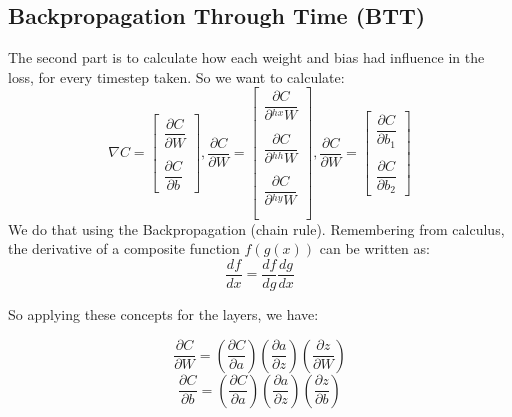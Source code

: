 \documentclass[12pt]{article}
\begin{document}
\subsection{Backpropagation Through Time (BTT)}
The second part is to calculate how each weight and bias had influence in the loss, for every timestep taken. So we want to calculate:
\begin{equation}
\nabla C
=
\begin{bmatrix}
\dfrac{\partial C}{\partial W} \\\\
\dfrac{\partial C}{\partial b} 
\end{bmatrix},
\dfrac{\partial C}{\partial W} = 
\begin{bmatrix}
\dfrac{\partial C}{\partial {}^{hx}W} \\\\
\dfrac{\partial C}{\partial {}^{hh}W} \\\\
\dfrac{\partial C}{\partial {}^{hy}W} \\\\
\end{bmatrix},
\dfrac{\partial C}{\partial W} = 
\begin{bmatrix}
\dfrac{\partial C}{\partial b_{1}} \\\\
\dfrac{\partial C}{\partial b_{2}} 
\end{bmatrix}
\end{equation}
We do that using the Backpropagation (chain rule). Remembering from calculus, the derivative of a composite function $f(g(x))$ can be written as:
\begin{equation}
    \dfrac{df}{dx} = \dfrac{df}{dg} \dfrac{dg}{dx}
\end{equation}

So applying these concepts for the layers, we have:

\begin{equation}
    \dfrac{\partial C}{\partial W} = \left( \dfrac{\partial C}{\partial a}\right) \left( \dfrac{\partial a}{\partial z}\right) \left(\dfrac{\partial z}{\partial W} \right)
\end{equation}
\begin{equation}
    \dfrac{\partial C}{\partial b} = \left( \dfrac{\partial C}{\partial a}\right) \left( \dfrac{\partial a}{\partial z}\right) \left(\dfrac{\partial z}{\partial b} \right)
\end{equation} \mbox{} \\
\end{document}
